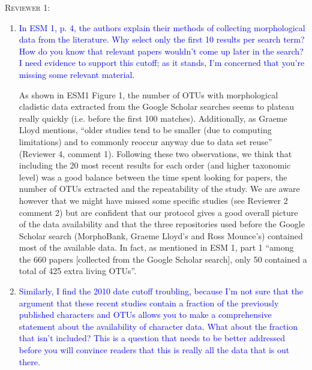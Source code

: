 \documentclass[12pt,letterpaper]{article}
\renewcommand{\section}[1]{%
\bigskip
\begin{center}
\begin{Large}
\normalfont\scshape #1
\medskip
\end{Large}
\end{center}}
\begin{document}
\section{Reviewer 1:}
\begin{enumerate}
\item{\textcolor{blue}{In ESM 1, p. 4, the authors explain their methods of collecting morphological data from the literature. Why select only the first 10 results per search term? How do you know that relevant papers wouldn't come up later in the search? I need evidence to support this cutoff; as it stands, I'm concerned that you're missing some relevant material.}}

As shown in ESM1 Figure 1, the number of OTUs with morphological cladistic data extracted from the Google Scholar searches seems to plateau really quickly (i.e. before the first 100 matches).
Additionally, as Graeme Lloyd mentions, ``older studies tend to be smaller (due to computing limitations) and to commonly reoccur anyway due to data set reuse'' (Reviewer 4, comment 1).
Following these two observations, we think that including the 20 most recent results %
 for each order (and higher taxonomic level) was a good balance between the time spent looking for papers, the number of OTUs extracted and the repeatability of the study.
We are aware however that we might have missed some specific studies (see Reviewer 2 comment 2) but are confident that our protocol gives a good overall picture of the data availability and that the three repositories used before the Google Scholar search (MorphoBank, Graeme Lloyd's and Ross Mounce's) contained most of the available data.
In fact, as mentioned in ESM 1, part 1 ``among the 660 papers [collected from the Google Scholar search], only 50 contained a total of 425 extra living OTUs''.

\item{\textcolor{blue}{Similarly, I find the 2010 date cutoff troubling, because I'm not sure that the argument that these recent studies contain a fraction of the previously published characters and OTUs allows you to make a comprehensive statement about the availability of character data. What about the fraction that isn't included? This is a question that needs to be better addressed before you will convince readers that this is really all the data that is out there.}}


\end{enumerate}
\end{document}
